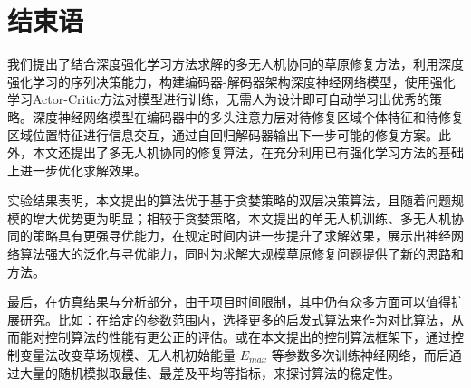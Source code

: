 \documentclass[AutoFakeBold]{LZUThesis}
\begin{document}
\chapter{结束语}

我们提出了结合深度强化学习方法求解的多无人机协同的草原修复方法，利用深度强化学习的序列决策能力，构建编码器-解码器架构深度神经网络模型，使用强化学习Actor-Critic方法对模型进行训练，无需人为设计即可自动学习出优秀的策略。深度神经网络模型在编码器中的多头注意力层对待修复区域个体特征和待修复区域位置特征进行信息交互，通过自回归解码器输出下一步可能的修复方案。此外，本文还提出了多无人机协同的修复算法，在充分利用已有强化学习方法的基础上进一步优化求解效果。

实验结果表明，本文提出的算法优于基于贪婪策略的双层决策算法，且随着问题规模的增大优势更为明显；相较于贪婪策略，本文提出的单无人机训练、多无人机协同的策略具有更强寻优能力，在规定时间内进一步提升了求解效果，展示出神经网络算法强大的泛化与寻优能力，同时为求解大规模草原修复问题提供了新的思路和方法。

最后，在仿真结果与分析部分，由于项目时间限制，其中仍有众多方面可以值得扩展研究。比如：在给定的参数范围内，选择更多的启发式算法来作为对比算法，从而能对控制算法的性能有更公正的评估。或在本文提出的控制算法框架下，通过控制变量法改变草场规模、无人机初始能量 $E_{max}$ 等参数多次训练神经网络，而后通过大量的随机模拟取最佳、最差及平均等指标，来探讨算法的稳定性。



\end{document}
